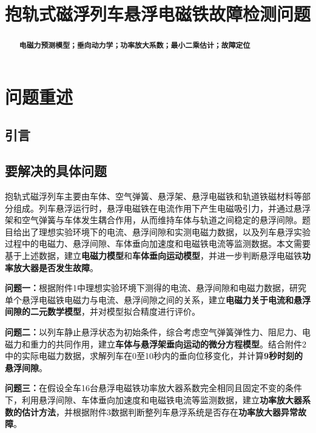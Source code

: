\documentclass[a4paper]{nmmcm}
\title{\heiti\zihao{3} 抱轨式磁浮列车悬浮电磁铁故障检测问题}
\date{}
\begin{document}
\begin{abstract}


\begin{keywords}
{\song\xiaosihao
\textbf{电磁力预测模型；垂向动力学；功率放大系数；最小二乘估计；故障定位}}
\end{keywords}

\end{abstract}
\maketitle
\tableofcontents

\newpage
\setcounter{page}{1}
\pagestyle{fancy}

\section{问题重述}
\subsection{引言}


\subsection{要解决的具体问题}

\setlength{\parindent}{2em}

\indent 抱轨式磁浮列车主要由车体、空气弹簧、悬浮架、悬浮电磁铁和轨道铁磁材料等部分组成。列车悬浮运行时，悬浮电磁铁在电流作用下产生电磁吸引力，并通过悬浮架和空气弹簧与车体发生耦合作用，从而维持车体与轨道之间稳定的悬浮间隙。题目给出了理想实验环境下的电流、悬浮间隙和实测电磁力数据，以及列车悬浮实验过程中的电磁力、悬浮间隙、车体垂向加速度和电磁铁电流等监测数据。本文需要基于上述数据，建立\textbf{电磁力模型}和\textbf{车体垂向运动模型}，并进一步判断悬浮电磁铁\textbf{功率放大器是否发生故障}。

\indent \textbf{问题一：}根据附件1中理想实验环境下测得的电流、悬浮间隙和电磁力数据，研究单个悬浮电磁铁电磁力与电流、悬浮间隙之间的关系，建立\textbf{电磁力关于电流和悬浮间隙的二元数学模型}，并对模型拟合精度进行评价。

\indent \textbf{问题二：}以列车静止悬浮状态为初始条件，综合考虑空气弹簧弹性力、阻尼力、电磁力和重力的共同作用，建立\textbf{车体与悬浮架垂向运动的微分方程模型}。结合附件2中的实际电磁力数据，求解列车在0至10秒内的垂向位移变化，并计算\textbf{9秒时刻的悬浮间隙}。

\indent \textbf{问题三：}在假设全车16台悬浮电磁铁功率放大器系数完全相同且固定不变的条件下，利用悬浮间隙、车体垂向加速度和电磁铁电流等监测数据，建立\textbf{功率放大器系数的估计方法}，并根据附件3数据判断整列车悬浮系统是否存在\textbf{功率放大器异常故障}。
\end{document}
